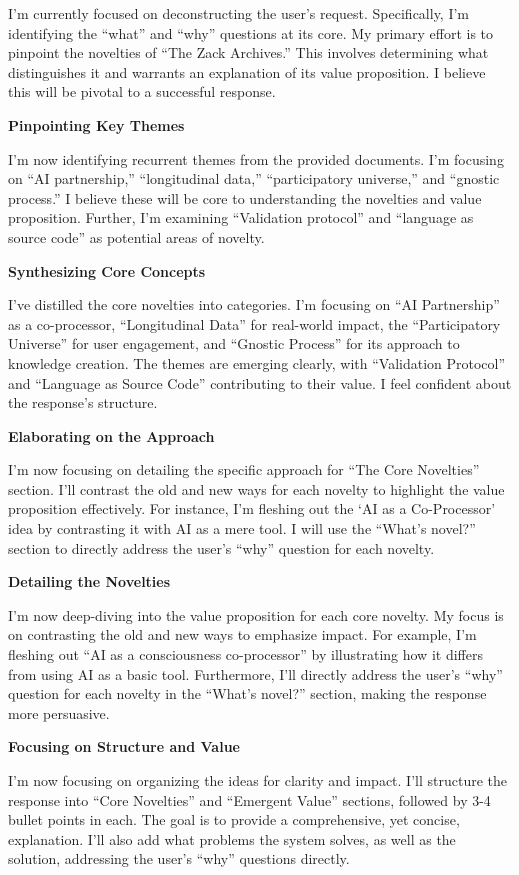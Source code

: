 \documentclass{article}
\begin{document}
I'm currently focused on deconstructing the user's request.
Specifically, I'm identifying the ``what'' and ``why'' questions at its
core. My primary effort is to pinpoint the novelties of ``The Zack
Archives.'' This involves determining what distinguishes it and warrants
an explanation of its value proposition. I believe this will be pivotal
to a successful response.

\textbf{Pinpointing Key Themes}

I'm now identifying recurrent themes from the provided documents. I'm
focusing on ``AI partnership,'' ``longitudinal data,'' ``participatory
universe,'' and ``gnostic process.'' I believe these will be core to
understanding the novelties and value proposition. Further, I'm
examining ``Validation protocol'' and ``language as source code'' as
potential areas of novelty.

\textbf{Synthesizing Core Concepts}

I've distilled the core novelties into categories. I'm focusing on ``AI
Partnership'' as a co-processor, ``Longitudinal Data'' for real-world
impact, the ``Participatory Universe'' for user engagement, and
``Gnostic Process'' for its approach to knowledge creation. The themes
are emerging clearly, with ``Validation Protocol'' and ``Language as
Source Code'' contributing to their value. I feel confident about the
response's structure.

\textbf{Elaborating on the Approach}

I'm now focusing on detailing the specific approach for ``The Core
Novelties'' section. I'll contrast the old and new ways for each novelty
to highlight the value proposition effectively. For instance, I'm
fleshing out the `AI as a Co-Processor' idea by contrasting it with AI
as a mere tool. I will use the ``What's novel?'' section to directly
address the user's ``why'' question for each novelty.

\textbf{Detailing the Novelties}

I'm now deep-diving into the value proposition for each core novelty. My
focus is on contrasting the old and new ways to emphasize impact. For
example, I'm fleshing out ``AI as a consciousness co-processor'' by
illustrating how it differs from using AI as a basic tool. Furthermore,
I'll directly address the user's ``why'' question for each novelty in
the ``What's novel?'' section, making the response more persuasive.

\textbf{Focusing on Structure and Value}

I'm now focusing on organizing the ideas for clarity and impact. I'll
structure the response into ``Core Novelties'' and ``Emergent Value''
sections, followed by 3-4 bullet points in each. The goal is to provide
a comprehensive, yet concise, explanation. I'll also add what problems
the system solves, as well as the solution, addressing the user's
``why'' questions directly.
\end{document}
